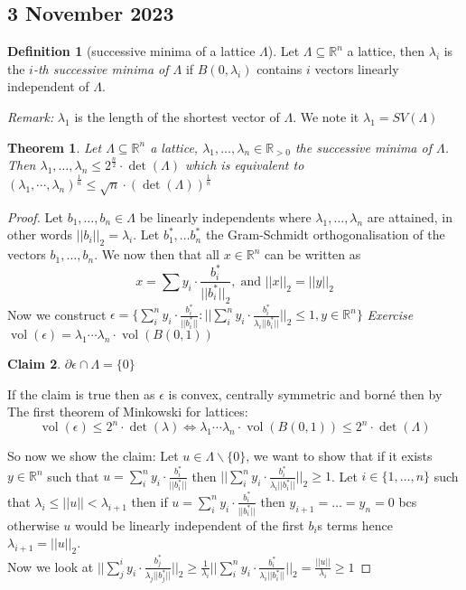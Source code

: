 \documentclass[a4paper,11pt,american]{article}
\newcommand{\R}{\mathbb{R}}
\DeclareMathOperator{\vol}{vol}
\theoremstyle{plain}
\newtheorem{theorem}{Theorem}
\newtheorem{claim}[theorem]{Claim}
\theoremstyle{definition}
\newtheorem{definition}{Definition}
\begin{document}
\subsection*{3 November 2023}

\begin{definition}[successive minima of a lattice $\Lambda$]
    Let $\Lambda\subseteq \R^n$ a lattice, then $\lambda_i$ is the \emph{$i$-th successive minima of $\Lambda
    $} if $B(0,\lambda_i)$ contains $i$ vectors linearly independent of $\Lambda$.
\end{definition}
\emph{Remark:} $\lambda_1$ is the length of the shortest vector of $\Lambda$. We note it $\lambda_1=SV(\Lambda)$
\begin{theorem}
    Let $\Lambda\subseteq \R^n$ a lattice, $\lambda_1,\dots,\lambda_n\in\R_{>0}$ the successive minima of $\Lambda$. Then $\lambda_1,\dots,\lambda_n\leq 2^\frac{n}{2}\cdot\det(\Lambda)$ which is equivalent to  $(\lambda_1,\cdots,\lambda_n)^{\frac{1}{n}}\leq \sqrt{n}\cdot(\det(\Lambda))^{\frac{1}{n}}$
\end{theorem}
\begin{proof}
    Let $b_1,\dots,b_n\in\Lambda$ be linearly independents where $\lambda_1,\dots,\lambda_n$ are attained, in other words $\vert\vert b_i\vert\vert_2=\lambda_i$.
    Let $b_1^*,\dots b_n^*$ the Gram-Schmidt orthogonalisation of the vectors $b_1,\dots,b_n$. We now then that all $x\in\R^n$ can be written as $$x=\sum y_i\cdot \frac{b_i^*}{\vert\vert b_i^*\vert\vert_2},\; \text{and } \vert\vert x\vert\vert_2=\vert\vert y\vert\vert_2$$
    Now we construct $\epsilon=\{\sum_i^n y_i\cdot \frac{b_i^*}{\vert\vert b_i^*\vert\vert}:\vert\vert\sum_i^n y_i\cdot \frac{b_i^*}{\lambda_i\vert\vert b_i^*\vert\vert}\vert\vert_2\leq 1, y\in\R^n\}$
    \emph{Exercise} $\vol(\epsilon)=\lambda_1\cdots\lambda_n\cdot\vol(B(0,1))$
    \begin{claim}
        $\partial\epsilon\cap\Lambda=\{0\}$
    \end{claim}
    If the claim is true then as $\epsilon$ is convex, centrally symmetric and borné then by The first theorem of Minkowski for lattices: $$\vol(\epsilon)\leq 2^n\cdot\det(\lambda)\iff \lambda_1\cdots\lambda_n\cdot\vol(B(0,1))\leq 2^n\cdot\det(\Lambda)$$

    So now we show the claim: Let $u\in\Lambda\backslash\{0\}$, we want to show that if it exists $y\in\R^n$ such that $u=\sum_i^n y_i\cdot \frac{b_i^*}{\vert\vert b_i^*\vert\vert}$ then $\vert\vert\sum_i^n y_i\cdot \frac{b_i^*}{\lambda_i\vert\vert b_i^*\vert\vert}\vert\vert_2\geq 1$.
    Let $i\in\{1,\dots,n\}$ such that $\lambda_i\leq \vert\vert u\vert\vert<\lambda_{i+1}$ then if $u=\sum_i^n y_i\cdot \frac{b_i^*}{\vert\vert b_i^*\vert\vert}$ then $y_{i+1}=\dots=y_n=0$ bcs otherwise $u$ would be linearly independent of the first $b_i$s terms hence $\lambda_{i+1}=\vert\vert u\vert\vert_2$.\\
    Now we look at $\vert\vert\sum_j^i y_i\cdot \frac{b_j^*}{\lambda_j\vert\vert b_j^*\vert\vert}\vert\vert_2\geq\frac{1}{\lambda_i}\vert\vert\sum_i^n y_i\cdot \frac{b_i^*}{\lambda_i\vert\vert b_i^*\vert\vert}\vert\vert_2=\frac{\vert\vert u\vert\vert}{\lambda_i}\geq 1$
    \end{proof}
\end{document}
